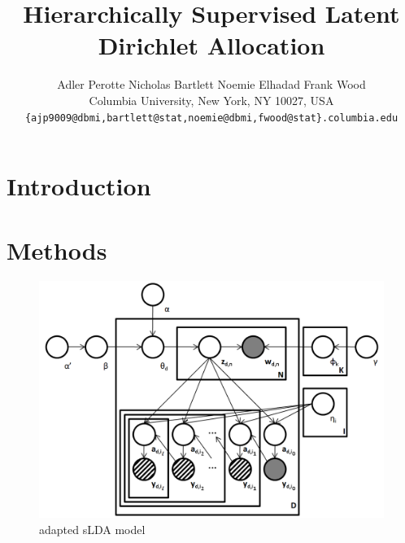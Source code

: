 \documentclass{article}
\title{Hierarchically Supervised Latent Dirichlet Allocation}
\author{
Adler Perotte\hspace{1cm} Nicholas Bartlett \hspace{1cm} Noemie Elhadad \hspace{1cm} Frank Wood\\
Columbia University, New York, NY 10027, USA \\
\texttt{\{ajp9009@dbmi,bartlett@stat,noemie@dbmi,fwood@stat\}.columbia.edu}
}
\begin{document}
\maketitle

\begin{abstract}

\end{abstract}

\section{Introduction}
\label{sec:introduction}





\section{Methods}
\label{sec:methods}


%
\begin{figure}[h]
 \centering \includegraphics[scale=0.3]{Graphical_Model2} \caption{adapted sLDA model}


\label{fig:example} 
\end{figure}
\end{document}
